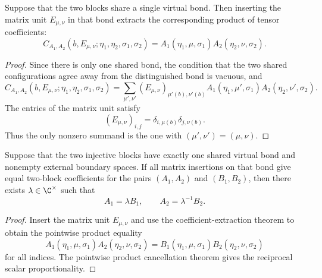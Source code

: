 \begin{theorem}%
    \label{thm:peps_twoBlockInsertedCoeff_singletonBond}
    \leanok
    Suppose that the two blocks share a single virtual bond. Then inserting
    the matrix unit $E_{\mu,\nu}$ in that bond extracts the corresponding
    product of tensor coefficients:
    \[
        C_{A_1,A_2}(b,E_{\mu,\nu};\eta_1,\eta_2,\sigma_1,\sigma_2)
        =
        A_1(\eta_1,\mu,\sigma_1)A_2(\eta_2,\nu,\sigma_2).
    \]
\end{theorem}
\begin{proof}\leanok
    Since there is only one shared bond, the condition that the two shared
    configurations agree away from the distinguished bond is vacuous, and
    \[
        C_{A_1,A_2}(b,E_{\mu,\nu};\eta_1,\eta_2,\sigma_1,\sigma_2)
        =
        \sum_{\mu',\nu'}
        (E_{\mu,\nu})_{\mu'(b),\nu'(b)}
        A_1(\eta_1,\mu',\sigma_1)A_2(\eta_2,\nu',\sigma_2).
    \]
    The entries of the matrix unit satisfy
    \[
        (E_{\mu,\nu})_{i,j}=\delta_{i,\mu(b)}\delta_{j,\nu(b)}.
    \]
    Thus the only nonzero summand is the one with
    $(\mu',\nu')=(\mu,\nu)$.
\end{proof}

\begin{theorem}%
    \label{thm:peps_twoInjectiveTensorInsertionComparison_singletonBond}
    \leanok
    Suppose that the two injective blocks have exactly one shared virtual
    bond and nonempty external boundary spaces. If all matrix insertions on
    that bond give equal two-block coefficients for the pairs
    $(A_1,A_2)$ and $(B_1,B_2)$, then there exists
    $\lambda\in\C^\times$ such that
    \[
        A_1=\lambda B_1,\qquad
        A_2=\lambda^{-1}B_2.
    \]
\end{theorem}
\begin{proof}\leanok
    Insert the matrix unit $E_{\mu,\nu}$ and use the coefficient-extraction
    theorem to obtain the pointwise product equality
    \[
        A_1(\eta_1,\mu,\sigma_1)A_2(\eta_2,\nu,\sigma_2)
        =
        B_1(\eta_1,\mu,\sigma_1)B_2(\eta_2,\nu,\sigma_2)
    \]
    for all indices. The pointwise product cancellation theorem gives the
    reciprocal scalar proportionality.
\end{proof}

